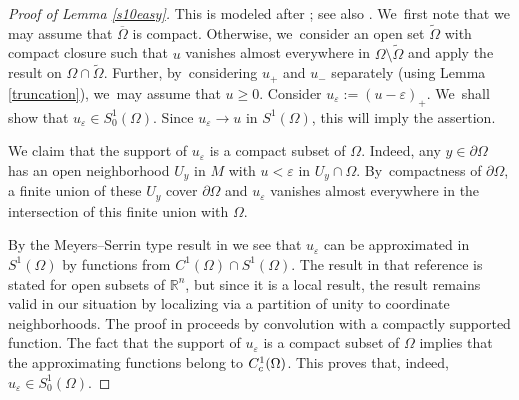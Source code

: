 \documentclass[11pt]{article}
\newcommand{\rc}{\textup{c}}
\theoremstyle{definition}
\let\epsilon\varepsilon
\newcommand{\1}{\mathbbm{1}}
\newcommand{\R}{\mathbb{R}}
\numberwithin{equation}{section}
\begin{document}
\begin{proof}[Proof of Lemma \ref{s10easy}]
This is modeled after \cite[Lem.\,1.26]{HeKiMa}; see also \cite[Lem.\,1]{HeNoSw}. We~first note that we may assume that $\overline\Omega$ is compact. Otherwise, we~consider an open set $\widetilde \Omega$ with compact closure such that $u$ vanishes almost everywhere in $\Omega\setminus\widetilde \Omega$ and apply the result on $\Omega\cap\widetilde \Omega$. Further, by~considering $u_+$ and $u_-$ separately (using Lemma \ref{truncation}), we~may assume that $u\geq 0$. Consider $u_\epsilon:=(u-\epsilon)_+$. We~shall show that $u_\epsilon\in S^1_0(\Omega)$. Since $u_\epsilon\to u$ in $S^1(\Omega)$, this will imply the assertion.

We claim that the support of $u_\epsilon$ is a compact subset of $\Omega$. Indeed, any $y\in\partial\Omega$ has an open neighborhood $U_y$ in $M$ with $u<\epsilon$ in $U_y\cap\Omega$. By~compactness of $\partial\Omega$, a finite union of these $U_y$ cover $\partial\Omega$ and $u_\epsilon$ vanishes almost everywhere in the intersection of this finite union with $\Omega$.

By the Meyers--Serrin type result in \cite[Th.\,1.13]{GaNh} we see that $u_\epsilon$ can be approximated in $S^1(\Omega)$ by functions from $C^1(\Omega)\cap S^1(\Omega)$. The result in that reference is stated for open subsets of $\R^n$, but since it is a local result, the result remains valid in our situation by localizing via a partition of unity to coordinate neighborhoods. The proof in \cite{GaNh} proceeds by convolution with a compactly supported function. The fact that the support of $u_\epsilon$ is a compact subset of $\Omega$ implies that the approximating functions belong to $C^1_\rc(\Omega)$. This proves that, indeed, $u_\epsilon\in S^1_0(\Omega)$.
\end{proof}
\end{document}

